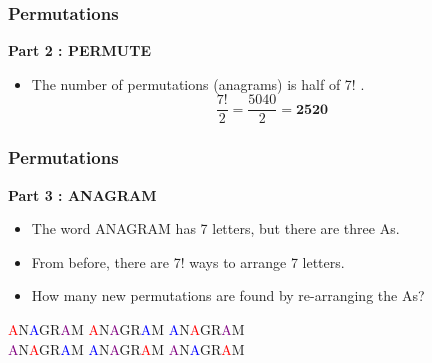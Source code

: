 \documentclass{beamer}
\begin{document}
\begin{frame}
\frametitle{Permutations}
\Large
\vspace{-0.3cm}
\textbf{Part 2 : PERMUTE}\\
\begin{itemize}
\item The number of permutations (anagrams) is half of 7! .
\LARGE
\[\frac{7!}{2} =  \frac{5040}{2} = \boldsymbol{2520} \]
\end{itemize}
\end{frame}

\begin{frame}
\frametitle{Permutations}
\Large
\vspace{-0.1cm}
\textbf{Part 3 : ANAGRAM}\\
\begin{itemize}
\item The word ANAGRAM has 7 letters, but there are three As.
\item From before, there are 7! ways to arrange 7 letters.
\item How many new permutations are found by re-arranging the As?
\end{itemize}
\LARGE
\begin{center}
\textcolor{red}{A}N\textcolor{blue}{A}GR\textcolor{purple}{A}M \; 
\textcolor{red}{A}N\textcolor{purple}{A}GR\textcolor{blue}{A}M \; 
\textcolor{blue}{A}N\textcolor{red}{A}GR\textcolor{purple}{A}M \; \\
\textcolor{purple}{A}N\textcolor{red}{A}GR\textcolor{blue}{A}M \; 
\textcolor{blue}{A}N\textcolor{purple}{A}GR\textcolor{red}{A}M \; 
\textcolor{purple}{A}N\textcolor{blue}{A}GR\textcolor{red}{A}M \; 
\end{center}
\end{frame}
\end{document}
